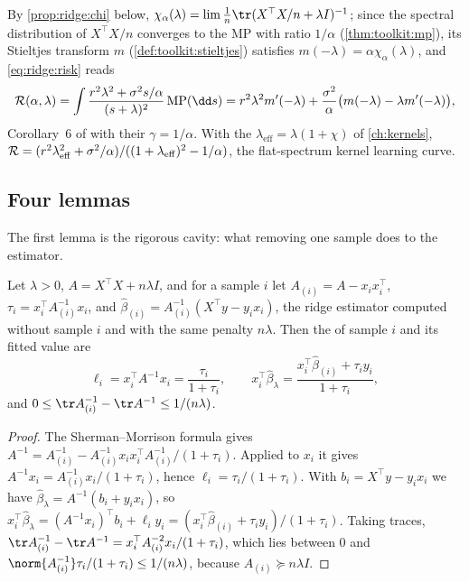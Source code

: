 \begin{refsection}
\begin{remark}\label{rem:ridge:mp}
By \cref{prop:ridge:chi} below, $\chi_\alpha(\lambda)=\lim\frac1n\tr(X^\top X/n+\lambda I)^{-1}$; since the spectral distribution of $X^\top X/n$ converges to the  $\mathrm{MP}$ with ratio $1/\alpha$ (\cref{thm:toolkit:mp}), its Stieltjes transform $m$ (\cref{def:toolkit:stieltjes}) satisfies $m(-\lambda)=\alpha\chi_\alpha(\lambda)$, and \eqref{eq:ridge:risk} reads
\[
\ridgeR(\alpha,\lambda)=\int\frac{r^2\lambda^2+\sigma^2s/\alpha}{(s+\lambda)^2}\,\mathrm{MP}(\dd s)=r^2\lambda^2m'(-\lambda)+\frac{\sigma^2}\alpha\bigl(m(-\lambda)-\lambda m'(-\lambda)\bigr),
\]
Corollary~6 of \textcite{HastieEtAl2022} with their $\gamma=1/\alpha$. With the  $\lambda_{\mathrm{eff}}=\lambda(1+\chi)$ of \cref{ch:kernels}, $\mathcal{R}=(r^2\lambda_{\mathrm{eff}}^2+\sigma^2/\alpha)/((1+\lambda_{\mathrm{eff}})^2-1/\alpha)$, the flat-spectrum kernel learning curve.
\end{remark}

\subsection{Four lemmas}

The first lemma is the rigorous cavity: what removing one sample does to the estimator.

\begin{lemma}\label{lem:ridge:loo}
Let $\lambda>0$, $A=X^\top X+n\lambda I$, and for a sample $i$ let $A_{(i)}=A-x_ix_i^\top$, $\tau_i=x_i^\top A_{(i)}^{-1}x_i$, and $\hat\beta_{(i)}=A_{(i)}^{-1}(X^\top y-y_ix_i)$, the ridge estimator computed without sample $i$ and with the same penalty $n\lambda$. Then the  of sample $i$ and its fitted value are
\[
\ell_i=x_i^\top A^{-1}x_i=\frac{\tau_i}{1+\tau_i},\qquad x_i^\top\hat\beta_\lambda=\frac{x_i^\top\hat\beta_{(i)}+\tau_iy_i}{1+\tau_i},
\]
and $0\le\tr A_{(i)}^{-1}-\tr A^{-1}\le1/(n\lambda)$.
\end{lemma}

\begin{proof}
The Sherman--Morrison formula gives $A^{-1}=A_{(i)}^{-1}-A_{(i)}^{-1}x_ix_i^\top A_{(i)}^{-1}/(1+\tau_i)$. Applied to $x_i$ it gives $A^{-1}x_i=A_{(i)}^{-1}x_i/(1+\tau_i)$, hence $\ell_i=\tau_i/(1+\tau_i)$. With $b_i=X^\top y-y_ix_i$ we have $\hat\beta_\lambda=A^{-1}(b_i+y_ix_i)$, so $x_i^\top\hat\beta_\lambda=(A^{-1}x_i)^\top b_i+\ell_iy_i=(x_i^\top\hat\beta_{(i)}+\tau_iy_i)/(1+\tau_i)$. Taking traces, $\tr A_{(i)}^{-1}-\tr A^{-1}=x_i^\top A_{(i)}^{-2}x_i/(1+\tau_i)$, which lies between $0$ and $\norm{A_{(i)}^{-1}}\tau_i/(1+\tau_i)\le1/(n\lambda)$, because $A_{(i)}\succeq n\lambda I$.
\end{proof}


\end{refsection}
